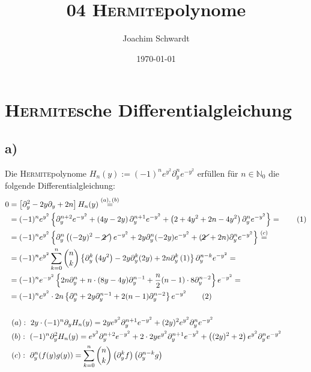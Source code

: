\documentclass[a4paper,12pt]{article}
\newcommand\numberthis{\addtocounter{equation}{1}\tag{\theequation}}
\newcommand{\kla}{}
\newcommand{\klam}{}
\newcommand{\klammer}{}
\begin{document}
\title{04 \textsc{Hermite}polynome}
\author{Joachim Schwardt}
\date{\today}
\maketitle

\section{\textsc{Hermite}sche Differentialgleichung}
\subsection*{a)}
Die \textsc{Hermite}polynome $H_n(y):=(-1)^ne^{y^2}\partial_y^ne^{-y^2}$ erfüllen für $n\in\mathbb{N}_0$ die folgende Differentialgleichung:
\begin{align*}
0&=\klam\left[ {\partial_y^2-2y\partial_y+2n} \right]H_n(y)\overset{(a),\,(b)}{=}\\
&=(-1)^ne^{y^2}\klammer\left\{ {\partial_y^{n+2}e^{-y^2} + \kla\left( {4y-2y} \right)\partial_y^{n+1}e^{-y^2} + \kla\left( {2+4y^2+2n-4y^2} \right)\partial_y^ne^{-y^2}} \right\}=\numberthis\label{DGL mit n+2}\\
&=(-1)^ne^{y^2}\klammer\left\{ {\partial_y^n\kla\left( {(-2y)^2-\cancel{2\ }} \right)e^{-y^2}+2y\partial_y^n(-2y)e^{-y^2}+(\cancel{2\ }+2n)\partial_y^ne^{-y^2}} \right\}\overset{(c)}{=}\\
&=(-1)^ne^{y^2}\sum_{k=0}^n\binom{n}{k}\klammer\left\{ \partial_y^k\kla\left( {4y^2} \right)-2y\partial_y^k(2y)+2n\partial_y^k\kla\left( {1} \right) \right\}\partial_y^{n-k}e^{-y^2}=\\
&=(-1)^ne^{-y^2}\klammer\left\{ {2n\partial_y^n+n\cdot (8y-4y)\partial_y^{n-1} + \frac{n}{2}(n-1)\cdot 8\partial_y^{n-2}} \right\}e^{-y^2}=\\
&=(-1)^ne^{y^2}\cdot 2n\klammer\left\{ {\partial_y^n+2y\partial_y^{n-1}+2(n-1)\partial_y^{n-2}} \right\}e^{-y^2}\numberthis\label{DGL mit n}\\
&\ \\
&\ (a):\ 2y\cdot (-1)^n\partial_yH_n(y)=2ye^{y^2}\partial_y^{n+1}e^{-y^2}+(2y)^2e^{y^2}\partial_y^ne^{-y^2} \\
&\ (b):\ (-1)^n\partial_y^2H_n(y)=e^{y^2}\partial_y^{n+2}e^{-y^2}+2\cdot 2ye^{y^2}\partial_y^{n+1}e^{-y^2}+\kla\left( {(2y)^2+2} \right)e^{y^2}\partial_y^ne^{-y^2} \\
&\ (c):\ \partial_y^n(f(y)g(y))=\sum_{k=0}^n\binom{n}{k}\kla\left( {\partial_y^kf} \right)\kla\left( {\partial_y^{n-k}g} \right)
\end{align*}
\end{document}
